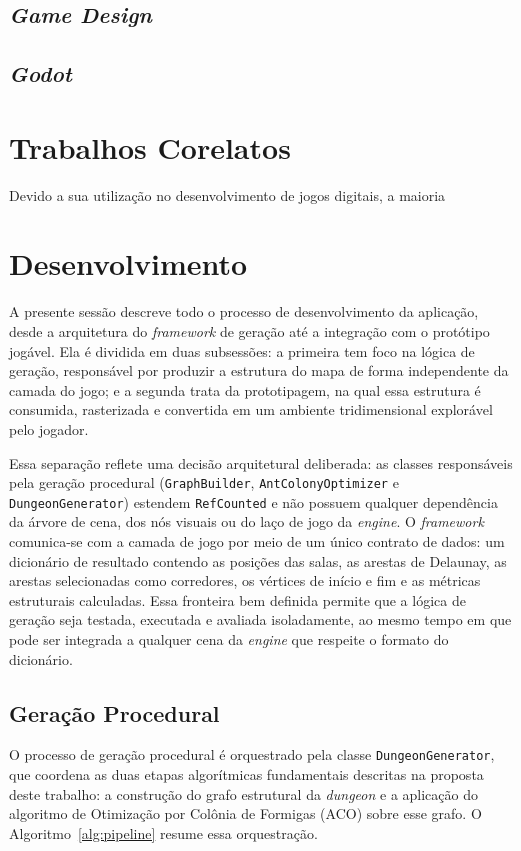 \documentclass[12pt]{article}
\begin{document}
\subsection{\textit{Game Design}}

\subsection{\textit{Godot}}

\section{Trabalhos Corelatos}
Devido a sua utilização no desenvolvimento de jogos digitais, a maioria

\section{Desenvolvimento}
A presente sessão descreve todo o processo de desenvolvimento da aplicação, desde a arquitetura do \textit{framework} de geração
até a integração com o protótipo jogável. Ela é dividida em duas subsessões: a primeira tem foco na lógica de geração, responsável
por produzir a estrutura do mapa de forma independente da camada do jogo; e a segunda trata da prototipagem, na qual essa estrutura
é consumida, rasterizada e convertida em um ambiente tridimensional explorável pelo jogador.
 
Essa separação reflete uma decisão arquitetural deliberada: as classes responsáveis pela geração procedural
(\texttt{GraphBuilder}, \texttt{AntColonyOptimizer} e \texttt{DungeonGenerator}) estendem \texttt{RefCounted} e não possuem
qualquer dependência da árvore de cena, dos nós visuais ou do laço de jogo da \textit{engine}. O \textit{framework} comunica-se
com a camada de jogo por meio de um único contrato de dados: um dicionário de resultado contendo as posições das salas, as arestas
de Delaunay, as arestas selecionadas como corredores, os vértices de início e fim e as métricas estruturais calculadas. Essa
fronteira bem definida permite que a lógica de geração seja testada, executada e avaliada isoladamente, ao mesmo tempo em que pode
ser integrada a qualquer cena da \textit{engine} que respeite o formato do dicionário.
 
\subsection{Geração Procedural}
O processo de geração procedural é orquestrado pela classe \texttt{DungeonGenerator}, que coordena as duas etapas algorítmicas
fundamentais descritas na proposta deste trabalho: a construção do grafo estrutural da \textit{dungeon} e a aplicação do algoritmo
de Otimização por Colônia de Formigas (ACO) sobre esse grafo. O Algoritmo~\ref{alg:pipeline} resume essa orquestração.
 
\end{document}
